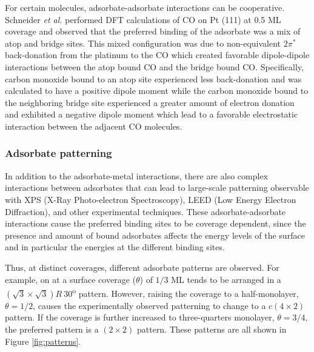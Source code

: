 For certain molecules, adsorbate-adsorbate interactions can be cooperative.
Schneider {\em et al.} performed DFT calculations of CO on Pt (111) at 0.5 ML
coverage and observed that the preferred binding of the adsorbate was a mix of
atop and bridge sites.\citep{Deshlahra:2012aa} This mixed configuration was due
to non-equivalent $2\pi^*$ back-donation from the platinum to the CO which
created favorable dipole-dipole interactions between the atop bound CO and the
bridge bound CO.  Specifically, carbon monoxide bound to an atop site
experienced less back-donation and was calculated to have a positive dipole
moment while the carbon monoxide bound to the neighboring bridge site
experienced a greater amount of electron donation and exhibited a negative
dipole moment which lead to a favorable electrostatic interaction between the
adjacent CO molecules.


\subsubsection{Adsorbate patterning}
In addition to the adsorbate-metal interactions, there are also complex
interactions between adsorbates that can lead to large-scale patterning observable
with XPS (X-Ray Photo-electron Spectroscopy), LEED (Low Energy
Electron Diffraction), and other experimental techniques. These
adsorbate-adsorbate interactions cause the preferred binding sites to be
coverage dependent, since the presence and amount of bound adsorbates
affects the energy levels of the surface and in particular the energies at the
different binding sites.

Thus, at distinct coverages, different adsorbate patterns are observed. For example,
 on  at a surface coverage ($\theta$) of $1/3$ ML tends to be arranged in a
$(\sqrt{3}\times\sqrt{3})R\ 30$\textsuperscript{o} pattern. However, raising the coverage
to a half-monolayer, $\theta = 1/2$, causes the experimentally observed
patterning to change to a $c(4\times2)$ pattern. If the coverage is further
increased to three-quarters monolayer, $\theta = 3/4$, the preferred pattern is
a $(2\times2)$ pattern.\citep{Guo:1989aa} These patterns are all shown in
Figure \ref{fig:patterns}.

